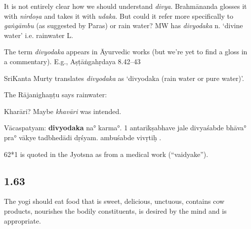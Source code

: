 \begin{ekdosis}
\begin{philcomm}[hp01_062]
It is not entirely clear how we should understand \emph{divya}. Brahmānanda glosses it with \emph{nirdoṣa} and takes it with \emph{udaka}. But could it refer more specifically to \emph{gaṅgāmbu} (as suggested by Paras) or rain water? MW has \emph{divyodaka} n. `divine water' i.e. rainwater L.

The term \emph{divyodaka} appears in Āyurvedic works (but we’re yet to find a gloss in a commentary). E.g.,
Aṣṭāṅgahṛdaya 8.42–43

\begin{versinnote}
\end{versinnote}

SriKanta Murty translates \emph{divyodaka} as ‘divyodaka (rain water or pure water)'.

The Rājanighaṇṭu says rainwater:

\begin{versinnote}
\end{versinnote}

Kharāri? Maybe \emph{khavāri} was intended.

Vācaspatyam:
\textbf{divyodaka} na° karma°.
1 antarīkṣabhave jale divyaśabde bhāva° pra° vākye tadbhedādi dṛśyam.
ambuśabde vivṛtiḥ .

62*1 is quoted in the Jyotsna as from a medical work (“vaidyake”).
\end{philcomm}

\subsection*{1.63}
\begin{translation}[hp01_063]
The yogi should eat food that is sweet, delicious, unctuous, contains cow products, nourishes the bodily constituents, is desired by the mind and is appropriate.
\end{translation}

\begin{sources}[hp01_063]
\end{sources}


\end{ekdosis}
